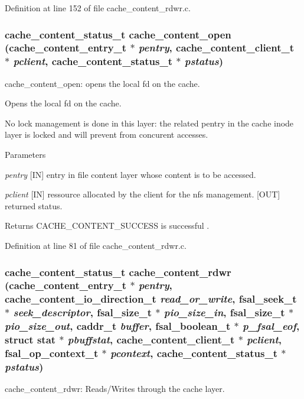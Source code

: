 Definition at line 152 of file cache\_\-content\_\-rdwr.c.
\subsubsection[{cache\_\-content\_\-open}]{\setlength{\rightskip}{0pt plus 5cm}cache\_\-content\_\-status\_\-t cache\_\-content\_\-open (cache\_\-content\_\-entry\_\-t $\ast$ {\em pentry}, \/  cache\_\-content\_\-client\_\-t $\ast$ {\em pclient}, \/  cache\_\-content\_\-status\_\-t $\ast$ {\em pstatus})}\label{cache__content__rdwr_8c_af2c11cf4d5c20af4947042448d97a9d8}
cache\_\-content\_\-open: opens the local fd on the cache.

Opens the local fd on the cache.

No lock management is done in this layer: the related pentry in the cache inode layer is locked and will prevent from concurent accesses.


\begin{DoxyParams}{Parameters}
\item[{\em pentry}][IN] entry in file content layer whose content is to be accessed. \item[{\em pclient}][IN] ressource allocated by the client for the nfs management.  [OUT] returned status.\end{DoxyParams}
\begin{DoxyReturn}{Returns}
CACHE\_\-CONTENT\_\-SUCCESS is successful . 
\end{DoxyReturn}


Definition at line 81 of file cache\_\-content\_\-rdwr.c.
\subsubsection[{cache\_\-content\_\-rdwr}]{\setlength{\rightskip}{0pt plus 5cm}cache\_\-content\_\-status\_\-t cache\_\-content\_\-rdwr (cache\_\-content\_\-entry\_\-t $\ast$ {\em pentry}, \/  cache\_\-content\_\-io\_\-direction\_\-t {\em read\_\-or\_\-write}, \/  fsal\_\-seek\_\-t $\ast$ {\em seek\_\-descriptor}, \/  fsal\_\-size\_\-t $\ast$ {\em pio\_\-size\_\-in}, \/  fsal\_\-size\_\-t $\ast$ {\em pio\_\-size\_\-out}, \/  caddr\_\-t {\em buffer}, \/  fsal\_\-boolean\_\-t $\ast$ {\em p\_\-fsal\_\-eof}, \/  struct stat $\ast$ {\em pbuffstat}, \/  cache\_\-content\_\-client\_\-t $\ast$ {\em pclient}, \/  fsal\_\-op\_\-context\_\-t $\ast$ {\em pcontext}, \/  cache\_\-content\_\-status\_\-t $\ast$ {\em pstatus})}\label{cache__content__rdwr_8c_ab32dc3e95e49d7cb59346969e6787bf3}
cache\_\-content\_\-rdwr: Reads/Writes through the cache layer.

